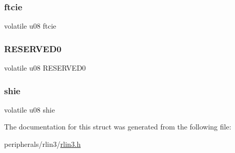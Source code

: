 \mbox{\label{structrlin3__lie_a748506f66ad585f6e6144394821d50c7}} 
\subsubsection{\texorpdfstring{ftcie}{ftcie}}
{\footnotesize\ttfamily volatile u08 ftcie}

\mbox{\label{structrlin3__lie_a59c0b30ccfb89f1b34e9682741859abd}} 
\subsubsection{\texorpdfstring{R\+E\+S\+E\+R\+V\+E\+D0}{RESERVED0}}
{\footnotesize\ttfamily volatile u08 R\+E\+S\+E\+R\+V\+E\+D0}

\mbox{\label{structrlin3__lie_a403584ca01a1fd13c7e9cb9aa5203203}} 
\subsubsection{\texorpdfstring{shie}{shie}}
{\footnotesize\ttfamily volatile u08 shie}



The documentation for this struct was generated from the following file\+:\begin{DoxyCompactItemize}
\item 
peripherals/rlin3/\mbox{\hyperlink{rlin3_8h}{rlin3.\+h}}\end{DoxyCompactItemize}
